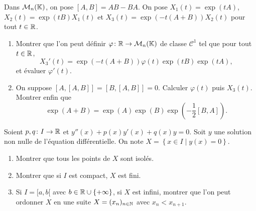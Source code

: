 \documentclass[12pt]{article}
\begin{document}
\begin{exercise}
	Dans $\mathcal{M}_n(\mathbb{K})$, on pose $[A,B]=AB-BA$. On pose $X_1(t)=\exp(tA)$, $X_2(t)=\exp(tB)X_1(t)$ et $X_3(t)=\exp(-t(A+B))X_2(t)$ pour tout $t\in\mathbb{R}$.
	\begin{enumerate}
		\item Montrer que l'on peut définir $\varphi\colon\mathbb{R}\to\mathcal{M}_n(\mathbb{K})$ de classe $\mathcal{C}^{1}$ tel que pour tout $t\in\mathbb{R}$, 
		\begin{equation}
			X_3'(t)=\exp(-t(A+B))\varphi(t)\exp(tB)\exp(tA),
		\end{equation}
		et évaluer $\varphi'(t)$.

		\item On suppose $[A,[A,B]]=[B,[A,B]]=0$. Calculer $\varphi(t)$ puis $X_3(t)$. Montrer enfin que 
		\begin{equation}
			\exp(A+B)=\exp(A)\exp(B)\exp\left(-\frac{1}{2}[B,A]\right).
		\end{equation}
	\end{enumerate}
\end{exercise}

\begin{exercise}
	Soient $p,q\colon I\to\mathbb{R}$ et $y''(x)+p(x)y'(x)+q(x)y=0$. Soit $y$ une solution non nulle de l'équation différentielle. On note $X=\left\lbrace x\in I\middle| y(x)=0\right\rbrace$.
	\begin{enumerate}
		\item Montrer que tous les points de $X$ sont isolés.
		\item Montrer que si $I$ est compact, $X$ est fini.
		\item Si $I=[a,b[$ avec $b\in\mathbb{R}\cup\left\lbrace+\infty\right\rbrace$, si $X$ est infini, montrer que l'on peut ordonner $X$ en une suite $X=(x_n)_{n\in\mathbb{N}}$ avec $x_n<x_{n+1}$.
	\end{enumerate}
\end{exercise}
\end{document}

